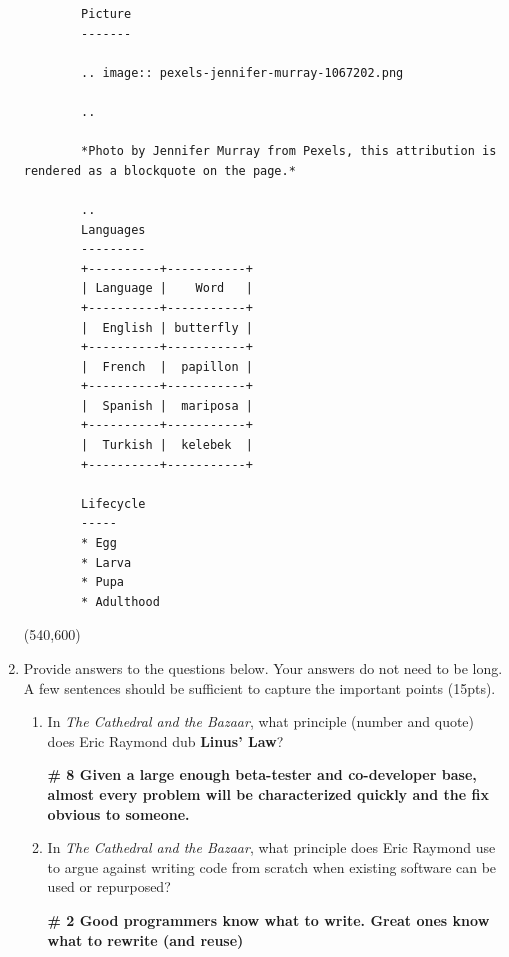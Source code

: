 \documentclass[10pt]{article}
\begin{document}
\begin{enumerate}
\begin{lstlisting}
    	Picture
    	-------
    	
    	.. image:: pexels-jennifer-murray-1067202.png
    	
    	..
    	
    	*Photo by Jennifer Murray from Pexels, this attribution is rendered as a blockquote on the page.*
    	
    	..
    	Languages
    	---------
    	+----------+-----------+
    	| Language |    Word   |
    	+----------+-----------+
    	|  English | butterfly |
    	+----------+-----------+
    	|  French  |  papillon |
    	+----------+-----------+
    	|  Spanish |  mariposa |
    	+----------+-----------+
    	|  Turkish |  kelebek  |
    	+----------+-----------+
    	
    	Lifecycle
    	-----
    	* Egg
    	* Larva
    	* Pupa
    	* Adulthood
    	\end{lstlisting}
  \else
  \hspace*{-0.4in}\framebox(540,600){}
  \fi
  
  \newpage

\item Provide answers to the questions below. Your answers do not need to be long. A few sentences should be sufficient to capture the important points (15pts).

\begin{enumerate}
	\item In  \textit{The Cathedral and the Bazaar}, what principle (number and quote) does Eric Raymond dub \textbf{Linus' Law}?
	
	\beginanswers
	\textbf{\# 8 Given a large enough beta-tester and co-developer base, almost
	every problem will be characterized quickly and the fix obvious to
	someone.}
	\else
	\bigskip
	\bigskip
	\bigskip
	\bigskip
	\bigskip
	\bigskip
	\bigskip
	\bigskip
	\bigskip
	\bigskip
\bigskip
\bigskip
\bigskip
\bigskip
\bigskip
\bigskip
\bigskip
\bigskip
\bigskip
\bigskip
	\fi

	\item In  \textit{The Cathedral and the Bazaar}, what principle does Eric Raymond use to argue against writing code from scratch when existing software can be used or repurposed?


	\beginanswers	
\textbf{\# 2 Good programmers know what to write. Great ones know what
to rewrite (and reuse)}	
    \else
	\bigskip
	\bigskip
	\bigskip
	\bigskip
	\bigskip
	\bigskip
	\bigskip
	\bigskip
	\bigskip
	\bigskip
	\bigskip
	\bigskip
	\bigskip
	\bigskip
	\bigskip
	\bigskip
	\bigskip
	\bigskip
	\bigskip
	\bigskip
	\fi
	

\end{enumerate}
\end{enumerate}
\end{document}
